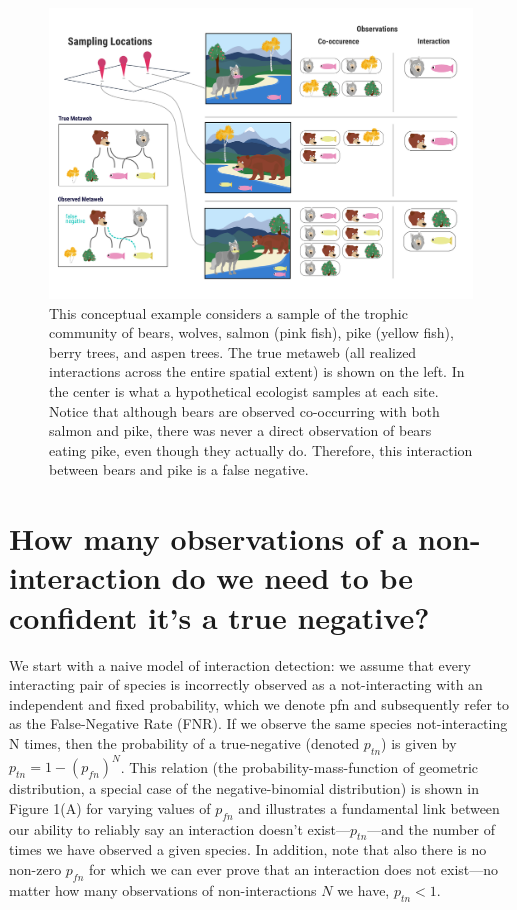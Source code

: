 \documentclass[10pt,oneside]{article}
\makeatletter
\def\maxwidth{\ifdim\Gin@nat@width>\linewidth\linewidth
\else\Gin@nat@width\fi}
\let\Oldincludegraphics\includegraphics
\renewcommand{\includegraphics}[1]{\Oldincludegraphics[width=\maxwidth]{#1}}
\makeatother
\begin{document}
\begin{figure}
\hypertarget{fig:concept}{%
\centering
\includegraphics{./figures/concept.png}
\caption{This conceptual example considers a sample of the trophic
community of bears, wolves, salmon (pink fish), pike (yellow fish),
berry trees, and aspen trees. The true metaweb (all realized
interactions across the entire spatial extent) is shown on the left. In
the center is what a hypothetical ecologist samples at each site. Notice
that although bears are observed co-occurring with both salmon and pike,
there was never a direct observation of bears eating pike, even though
they actually do. Therefore, this interaction between bears and pike is
a false negative.}\label{fig:concept}
}
\end{figure}

\hypertarget{how-many-observations-of-a-non-interaction-do-we-need-to-be-confident-its-a-true-negative}{%
\section{How many observations of a non-interaction do we need to be
confident it's a true
negative?}\label{how-many-observations-of-a-non-interaction-do-we-need-to-be-confident-its-a-true-negative}}

We start with a naive model of interaction detection: we assume that
every interacting pair of species is incorrectly observed as a
not-interacting with an independent and fixed probability, which we
denote pfn and subsequently refer to as the False-Negative Rate (FNR).
If we observe the same species not-interacting N times, then the
probability of a true-negative (denoted \(p_{tn}\)) is given by
\(p_{tn}=1-(p_{fn})^N\). This relation (the probability-mass-function of
geometric distribution, a special case of the negative-binomial
distribution) is shown in Figure 1(A) for varying values of \(p_{fn}\)
and illustrates a fundamental link between our ability to reliably say
an interaction doesn't exist---\(p_{tn}\)---and the number of times we
have observed a given species. In addition, note that also there is no
non-zero \(p_{fn}\) for which we can ever prove that an interaction does
not exist---no matter how many observations of non-interactions \(N\) we
have, \(p_{tn}<1\).
\end{document}
